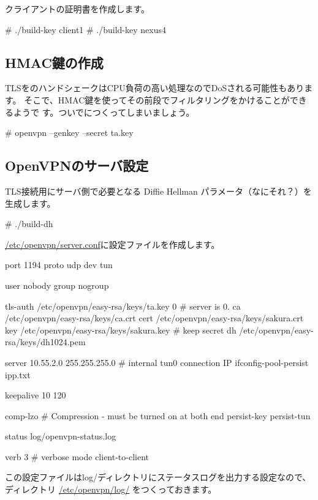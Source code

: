 \documentclass[mingoth,a4paper]{jsarticle}
\begin{document}
クライアントの証明書を作成します。
\begin{commandline}
 # ./build-key client1
 # ./build-key nexus4
\end{commandline}

\subsection{HMAC鍵の作成}

TLSをのハンドシェークはCPU負荷の高い処理なのでDoSされる可能性もあります。
そこで、HMAC鍵を使ってその前段でフィルタリングをかけることができるようで
す。ついでにつくってしまいましょう。

\begin{commandline}
 # openvpn --genkey --secret ta.key
\end{commandline}

\subsection{OpenVPNのサーバ設定}

TLS接続用にサーバ側で必要となる Diffie Hellman パラメータ（なにそれ？）を
生成します。

\begin{commandline}
 # ./build-dh
\end{commandline}

\url{/etc/openvpn/server.conf}に設定ファイルを作成します。

\begin{commandline}
port 1194
proto udp
dev tun

user nobody
group nogroup

tls-auth      /etc/openvpn/easy-rsa/keys/ta.key 0 # server is 0.
ca      /etc/openvpn/easy-rsa/keys/ca.crt
cert    /etc/openvpn/easy-rsa/keys/sakura.crt
key     /etc/openvpn/easy-rsa/keys/sakura.key  # keep secret
dh      /etc/openvpn/easy-rsa/keys/dh1024.pem

server 10.55.2.0 255.255.255.0  # internal tun0 connection IP
ifconfig-pool-persist ipp.txt

keepalive 10 120

comp-lzo         # Compression - must be turned on at both end
persist-key
persist-tun

status log/openvpn-status.log

verb 3  # verbose mode
client-to-client

\end{commandline}

この設定ファイルはlog/ディレクトリにステータスログを出力する設定なので、
ディレクトリ \url{/etc/openvpn/log/} をつくっておきます。
\end{document}
